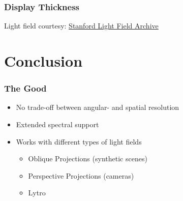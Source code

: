 \documentclass[12pt, compress]{beamer}
\begin{document}
\begin{frame}[fragile]
	\frametitle{Display Thickness}
	
	\begin{figure}
		\hspace{1cm}
	\end{figure}
	
	{\scriptsize Light field courtesy: \href{http://lightfield.stanford.edu/lfs.html}{Stanford Light Field Archive}}
\end{frame}

\section{Conclusion}

\begin{frame}[fragile]
	\frametitle{The Good}
	
	\begin{itemize}
		\item No trade-off between angular- and spatial resolution
		\item Extended spectral support
		\item Works with different types of light fields
		\begin{itemize}
			\item Oblique Projections (synthetic scenes)
			\item Perspective Projections (cameras)
			\item Lytro
		\end{itemize}
	\end{itemize}
\end{frame}
\end{document}
